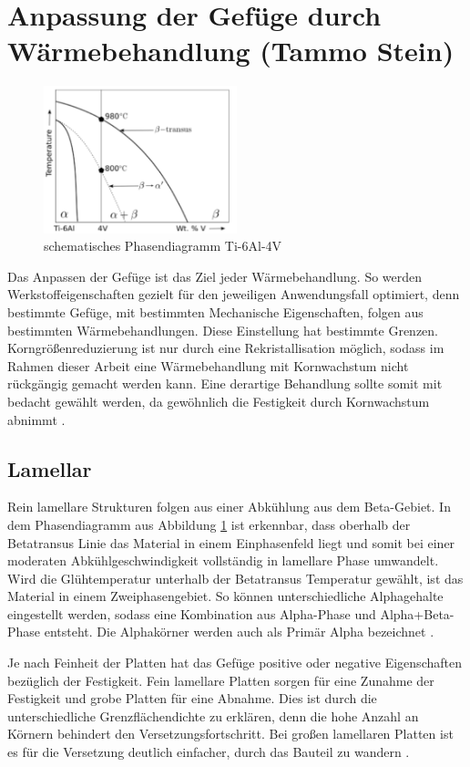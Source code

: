 \documentclass[a4paper, 11pt]{tubsreprt}
\begin{document}
\section{Anpassung der Gefüge durch Wärmebehandlung (Tammo Stein)}
\begin{figure}
	\centering
	\includegraphics[width=0.5\textwidth]{Bilder/Phasendiagram.PNG}
	\caption[Phasendiagramm]{schematisches Phasendiagramm Ti-6Al-4V \cite{Babu2008}}
	\label{Phasendiagram}
\end{figure}

Das Anpassen der Gefüge ist das Ziel jeder Wärmebehandlung. So werden Werkstoffeigenschaften gezielt für den jeweiligen Anwendungsfall optimiert, denn bestimmte Gefüge, mit bestimmten Mechanische Eigenschaften, folgen aus bestimmten Wärmebehandlungen. Diese Einstellung hat bestimmte Grenzen. Korngrößenreduzierung ist nur durch eine Rekristallisation möglich, sodass im Rahmen dieser Arbeit eine Wärmebehandlung mit Kornwachstum nicht rückgängig gemacht werden kann. Eine derartige Behandlung sollte somit mit bedacht gewählt werden, da gewöhnlich die Festigkeit durch Kornwachstum abnimmt \cite{Luetjering2007}.
\subsection{Lamellar}
Rein lamellare Strukturen folgen aus einer Abkühlung aus dem Beta-Gebiet. In dem Phasendiagramm aus Abbildung \ref{Phasendiagram} ist erkennbar, dass oberhalb der Betatransus Linie das Material in einem Einphasenfeld liegt und somit bei einer moderaten Abkühlgeschwindigkeit vollständig in lamellare Phase umwandelt. Wird die Glühtemperatur unterhalb der Betatransus Temperatur gewählt, ist das Material in einem Zweiphasengebiet. So können unterschiedliche Alphagehalte eingestellt werden, sodass eine Kombination aus Alpha-Phase und Alpha+Beta-Phase entsteht. Die Alphakörner werden auch als Primär Alpha bezeichnet \cite{Luetjering2007}.


Je nach Feinheit der Platten hat das Gefüge positive oder negative Eigenschaften bezüglich der Festigkeit. Fein lamellare Platten sorgen für eine Zunahme der Festigkeit und grobe Platten für eine Abnahme. Dies ist durch die unterschiedliche Grenzflächendichte zu erklären, denn die hohe Anzahl an Körnern behindert den Versetzungsfortschritt. Bei großen lamellaren Platten ist es für die Versetzung deutlich einfacher, durch das Bauteil zu wandern \cite{Luetjering2007}. 
\newpage
\end{document}
